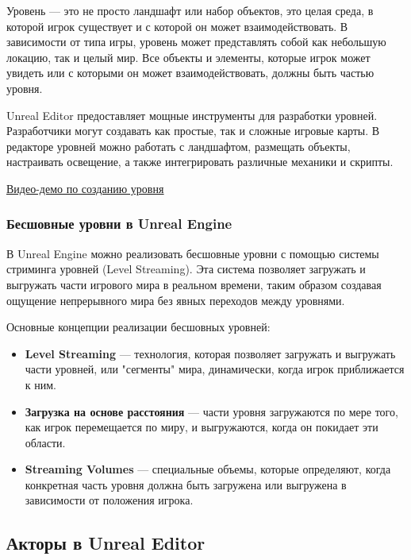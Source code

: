 Уровень — это не просто ландшафт или набор объектов, это целая среда, в которой игрок существует и с которой он может взаимодействовать. В зависимости от типа игры, уровень может представлять собой как небольшую локацию, так и целый мир. Все объекты и элементы, которые игрок может увидеть или с которыми он может взаимодействовать, должны быть частью уровня. \newline

Unreal Editor предоставляет мощные инструменты для разработки уровней. Разработчики могут создавать как простые, так и сложные игровые карты. В редакторе уровней можно работать с ландшафтом, размещать объекты, настраивать освещение, а также интегрировать различные механики и скрипты.
\newline

\href{https://drive.google.com/file/d/1H-fIOK-jv1CIRBoN6MKqyUqNhc3I0qKX/view?usp=drive_link}{\underline{Видео-демо по созданию уровня}}

\subsubsection{Бесшовные уровни в Unreal Engine}

В Unreal Engine можно реализовать бесшовные уровни с помощью системы стриминга уровней (Level Streaming). Эта система позволяет загружать и выгружать части игрового мира в реальном времени, таким образом создавая ощущение непрерывного мира без явных переходов между уровнями.

Основные концепции реализации бесшовных уровней:

\begin{itemize}
    \item \textbf{Level Streaming} — технология, которая позволяет загружать и выгружать части уровней, или "сегменты" мира, динамически, когда игрок приближается к ним.
    \item \textbf{Загрузка на основе расстояния} — части уровня загружаются по мере того, как игрок перемещается по миру, и выгружаются, когда он покидает эти области.
    \item \textbf{Streaming Volumes} — специальные объемы, которые определяют, когда конкретная часть уровня должна быть загружена или выгружена в зависимости от положения игрока.
\end{itemize}

\subsection{Акторы в Unreal Editor}

